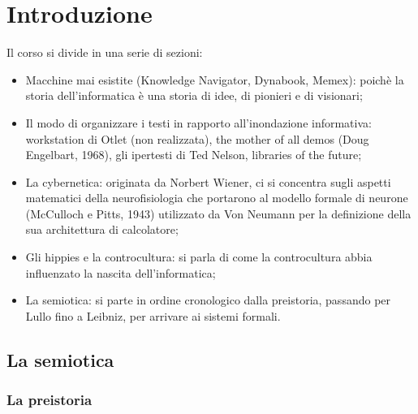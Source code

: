 \chapter{Introduzione}

Il corso si divide in una serie di sezioni:
\begin{itemize}
    \item Macchine mai esistite (Knowledge
    Navigator, Dynabook, Memex): poichè la storia dell'informatica
    è una storia di idee, di pionieri e di visionari;
    \item Il modo di organizzare i testi in rapporto all'inondazione 
    informativa: workstation di Otlet (non realizzata), the mother of all
    demos (Doug Engelbart, 1968), gli ipertesti di Ted Nelson, libraries
    of the future;
    \item La cybernetica: originata da Norbert Wiener, ci si concentra sugli
    aspetti matematici della neurofisiologia che portarono al modello formale di
    neurone (McCulloch e Pitts, 1943) utilizzato da Von Neumann per la
    definizione della sua architettura di calcolatore;
    \item Gli hippies e la controcultura: si parla di come la controcultura 
    abbia influenzato la nascita dell'informatica;
    \item La semiotica: si parte in ordine cronologico dalla preistoria, passando per Lullo fino
    a Leibniz, per arrivare ai sistemi formali.
\end{itemize}

\section{La semiotica}

\subsection{La preistoria}